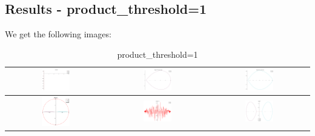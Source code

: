 \documentclass[a4paper,10pt]{article}
\begin{document}
 \subsection{Results - product\_threshold=1}
 We get the following images:
 \begin{table}[!ht]
 \caption{product\_threshold=1}
 \begin{tabular}{|c|c|c|}
  \hline
  \includegraphics[width=0.3\textwidth]{PT_1_z1.png} &
  \includegraphics[width=0.3\textwidth]{PT_1_C1z1.png} &
  \includegraphics[width=0.3\textwidth]{PT_1_C2z1.png} \\ \hline
  \includegraphics[width=0.3\textwidth]{PT_1_z2.png} &
  \includegraphics[width=0.3\textwidth]{PT_1_zed_C0.png} &
  \includegraphics[width=0.3\textwidth]{PT_1_zed.png} \\ \hline
 \end{tabular}
 \end{table}
 
\end{document}
